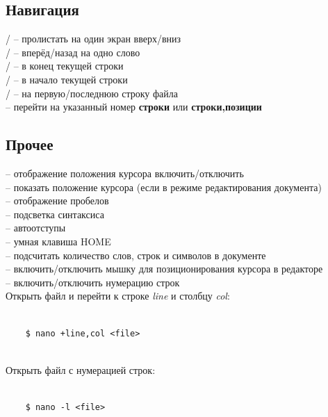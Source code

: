 \subsection*{Навигация}
\noindent
{}/ -- пролистать на один экран вверх/вниз\\
/ -- вперёд/назад  на одно слово\\
/ -- в конец текущей строки\\
/ -- в начало текущей строки\\
/\keys{ / }  -- на первую/последнюю строку файла\\
 -- перейти на указанный номер \textbf{строки} или \textbf{строки,позиции}\\

\subsection*{Прочее}
\noindent
{} -- отображение положения курсора включить/отключить\\
 -- показать положение курсора (если в режиме редактирования документа)\\
 -- отображение пробелов\\
 -- подсветка синтаксиса\\
 -- автоотступы\\
 -- умная клавиша HOME\\
 -- подсчитать количество слов, строк и символов в документе\\
 -- включить/отключить мышку для позиционирования курсора в редакторе\\
 -- включить/отключить нумерацию строк\\

Открыть файл  и перейти к строке \textit{line} и столбцу \textit{col}:
\begin{lstlisting}
	
	$ nano +line,col <file>
	
\end{lstlisting}	

Открыть файл  с нумерацией строк:
\begin{lstlisting}
	
	$ nano -l <file>
	
\end{lstlisting}	

